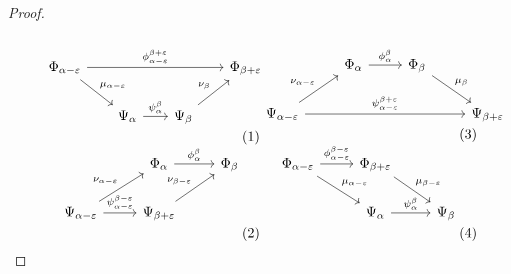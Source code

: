 \begin{proof}
  \begin{subequations}
  \begin{minipage}{0.45\textwidth}
  \begin{equation}\label{dgm:intr1}\begin{tikzcd}[column sep=scriptsize]
    \Phi_{\alpha-\e}  \arrow[to=Fb, "\phi_{\alpha-\e}^{\beta+\e}"]
                      \arrow[to=Ga, "\mu_{\alpha-\e}"]
    & & & |[alias=Fb]|
      \Phi_{\beta+\e} \\
    & |[alias=Ga]|
    \Psi_\alpha \arrow[to=Gb, "\psi_\alpha^\beta"]
    & |[alias=Gb]|
      \Psi_\beta \arrow[to=Fb, "\nu_\beta"] &
  \end{tikzcd}\end{equation}
  \begin{equation}\label{dgm:intr4}\begin{tikzcd}
    & |[alias=Fa]|
    \Phi_\alpha  \arrow[to=Fb, "\phi_\alpha^\beta"]
    & |[alias=Fb]|
      \Phi_\beta\\
    \Psi_{\alpha-\e}  \arrow[to=Gb, "\psi_{\alpha-\e}^{\beta-\e}"]
                      \arrow[to=Fa, "\nu_{\alpha-\e}"]
    & |[alias=Gb]|
      \Psi_{\beta + \e} \arrow[to=Fb, "\nu_{\beta-\e}"]&
  \end{tikzcd}\end{equation}
  \end{minipage} \begin{minipage}{0.45\textwidth}
  \begin{equation}\label{dgm:intr2}\begin{tikzcd}
    & |[alias=Fa]|
    \Phi_\alpha  \arrow[to=Fb, "\phi_\alpha^\beta"]
    & |[alias=Fb]|
      \Phi_\beta  \arrow[to=Gb, "\mu_\beta"] & \\
    \Psi_{\alpha-\e}  \arrow[to=Gb, "\psi_{\alpha-\e}^{\beta+\e}"]
                      \arrow[to=Fa, "\nu_{\alpha-\e}"]
    & & & |[alias=Gb]|
      \Psi_{\beta + \e}
  \end{tikzcd}\end{equation}
  \begin{equation}\label{dgm:intr3}\begin{tikzcd}
    \Phi_{\alpha-\e}  \arrow[to=Fb, "\phi_{\alpha-\e}^{\beta-\e}"]
                      \arrow[to=Ga, "\mu_{\alpha-\e}"]
    & |[alias=Fb]|
      \Phi_{\beta+\e} \arrow[to=Gb, "\mu_{\beta -\e}"] \\
    & |[alias=Ga]|
    \Psi_\alpha \arrow[to=Gb, "\psi_\alpha^\beta"]
    & |[alias=Gb]|
      \Psi_\beta
  \end{tikzcd}\end{equation}
  \end{minipage}
  \end{subequations}


\end{proof}
